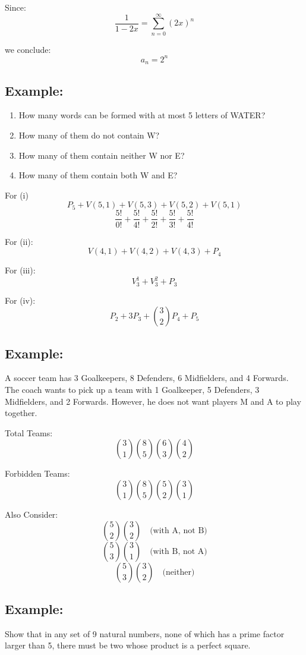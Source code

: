 \documentclass[11pt]{article}
\begin{document}
Since:
\[
\frac{1}{1-2x} = \sum_{n=0}^{\infty} (2x)^n
\]

we conclude:
\[
a_n = 2^n
\]

\subsection*{Example:}
\begin{enumerate}
    \item How many words can be formed with at most 5 letters of WATER?
    \item How many of them do not contain W?
    \item How many of them contain neither W nor E?
    \item How many of them contain both W and E?
\end{enumerate}

For (i)
\[
P_5 + V(5,1) + V(5,3) + V(5,2) + V(5,1)
\]
\[
\frac{5!}{0!} + \frac{5!}{4!} + \frac{5!}{2!} + \frac{5!}{3!} + \frac{5!}{4!}
\]

For (ii):
\[
V(4,1) + V(4,2) + V(4,3) + P_4
\]

For (iii):
\[
V_3^1 + V_3^2 + P_3
\]

For (iv):
\[
P_2 + 3 P_3 + \binom{3}{2} P_4 + P_5
\]

\subsection*{Example:}
A soccer team has 3 Goalkeepers, 8 Defenders, 6 Midfielders, and 4 Forwards. The coach wants to pick up a team with 1 Goalkeeper, 5 Defenders, 3 Midfielders, and 2 Forwards. However, he does not want players M and A to play together. 

\vspace{0.5cm}
Total Teams:
\[
\binom{3}{1} \binom{8}{5} \binom{6}{3} \binom{4}{2}
\]

Forbidden Teams:
\[
\binom{3}{1} \binom{8}{5} \binom{5}{2} \binom{3}{1}
\]

Also Consider:
\[
\binom{5}{2} \binom{3}{2} \quad \text{(with A, not B)}
\]
\[
\binom{5}{3} \binom{3}{1} \quad \text{(with B, not A)}
\]
\[
\binom{5}{3} \binom{3}{2} \quad \text{(neither)}
\]

\subsection*{Example:}

Show that in any set of 9 natural numbers, none of which has a prime factor larger than 5, there must be two whose product is a perfect square.
\end{document}
